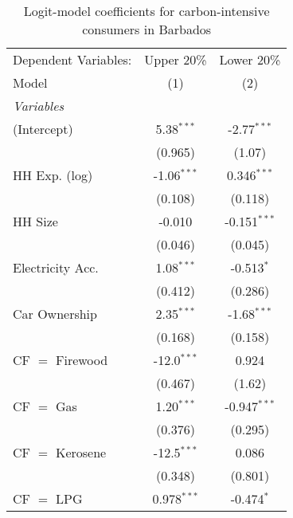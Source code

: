 
\begin{table}[htbp!]
   \centering
   \small
   \begin{adjustbox}{width = 1\textwidth, max height = 0.95\textheight, center}
      \begin{threeparttable}[b]
         \caption{\label{tab:Logit_1_BRB} Logit-model coefficients for carbon-intensive consumers in Barbados}
         \begin{tabular}{lcc}
            \tabularnewline \midrule \midrule
            Dependent Variables: & Upper 20\%    & Lower 20\%\\   
            Model                & (1)           & (2)\\  
            \midrule
            \emph{Variables}\\
            (Intercept)          & 5.38$^{***}$  & -2.77$^{***}$\\   
                                 & (0.965)       & (1.07)\\   
            HH Exp. (log)        & -1.06$^{***}$ & 0.346$^{***}$\\   
                                 & (0.108)       & (0.118)\\   
            HH Size              & -0.010        & -0.151$^{***}$\\   
                                 & (0.046)       & (0.045)\\   
            Electricity Acc.     & 1.08$^{***}$  & -0.513$^{*}$\\   
                                 & (0.412)       & (0.286)\\   
            Car Ownership        & 2.35$^{***}$  & -1.68$^{***}$\\   
                                 & (0.168)       & (0.158)\\   
            CF $=$ Firewood      & -12.0$^{***}$ & 0.924\\   
                                 & (0.467)       & (1.62)\\   
            CF $=$ Gas           & 1.20$^{***}$  & -0.947$^{***}$\\   
                                 & (0.376)       & (0.295)\\   
            CF $=$ Kerosene      & -12.5$^{***}$ & 0.086\\   
                                 & (0.348)       & (0.801)\\   
            CF $=$ LPG           & 0.978$^{***}$ & -0.474$^{*}$\\   

\end{tabular}
\end{threeparttable}
\end{adjustbox}
\end{table}
